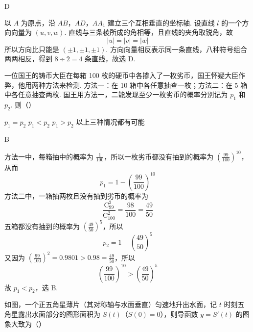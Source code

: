 \begin{answer}
D
\end{answer}

\begin{solution}
以 \(A\) 为原点，沿 \(AB\)，\(AD\)，\(AA_1\) 建立三个互相垂直的坐标轴. 设直线 \(l\) 的一个方向向量为 \((u,v,w)\). 直线与三条棱所成的角相等，且直线的夹角取锐角，故
\[
|u|=|v|=|w|
\]
所以方向比只能是 \((\pm1,\pm1,\pm1)\). 方向向量相反表示同一条直线，八种符号组合两两相反，得到 \(8\div2=4\) 条直线，故选 D.
\end{solution}

\begin{problem}
一位国王的铸币大臣在每箱 100 枚的硬币中各掺入了一枚劣币，国王怀疑大臣作弊，他用两种方法来检测. 方法一：在 10 箱中各任意抽查一枚；方法二：在 5 箱中各任意抽查两枚. 国王用方法一，二能发现至少一枚劣币的概率分别记为 \(p_1\) 和 \(p_2\). 则（\quad）

\choices
    {\(p_1 = p_2\)}
    {\(p_1 < p_2\)}
    {\(p_1 > p_2\)}
    {以上三种情况都有可能}
\end{problem}

\begin{answer}
B
\end{answer}

\begin{solution}
方法一中，每箱抽中的概率为 \(\frac1{100}\)，所以一枚劣币都没有抽到的概率为 \(\left(\frac{99}{100}\right)^{10}\)，从而
\[
p_1=1-\left(\frac{99}{100}\right)^{10}
\]
方法二中，一箱抽两枚且没有抽到劣币的概率为
\[
\frac{\mathrm C_{99}^{2}}{\mathrm C_{100}^{2}}=\frac{98}{100}=\frac{49}{50}
\]
五箱都没有抽到的概率为 \(\left(\frac{49}{50}\right)^5\)，所以
\[
p_2=1-\left(\frac{49}{50}\right)^5
\]
又因为 \(\left(\frac{99}{100}\right)^2=0.9801>0.98=\frac{49}{50}\)，所以
\[
\left(\frac{99}{100}\right)^{10}>\left(\frac{49}{50}\right)^5
\]
故 \(p_1<p_2\)，选 B.
\end{solution}

\begin{problem}
如图，一个正五角星薄片（其对称轴与水面垂直）匀速地升出水面，记 \(t\) 时刻五角星露出水面部分的图形面积为 \(S(t)\)（\(S(0)=0\)），则导函数 \(y = S'(t)\) 的图象大致为（\quad）


    {}
    {}
    {}
\end{problem}

